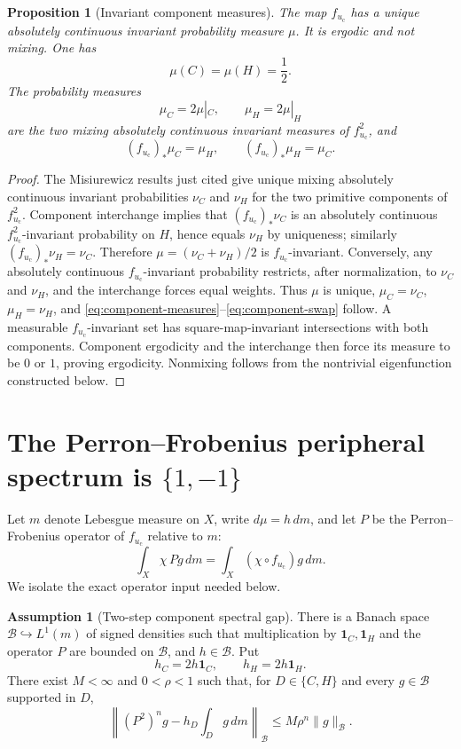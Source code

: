 \documentclass[11pt]{article}
\newtheorem{proposition}[theorem]{Proposition}
\theoremstyle{definition}
\newtheorem{assumption}[theorem]{Assumption}
\theoremstyle{remark}
\newcommand{\uc}{u_{\mathrm c}}
\newcommand{\cB}{\mathcal B}
\newcommand{\one}{\mathbf 1}
\begin{document}
\begin{proposition}[Invariant component measures]\label{prop:component-measures}
The map $f_{\uc}$ has a unique absolutely continuous invariant probability measure $\mu$.  It is ergodic and not mixing.  One has
\[
    \mu(C)=\mu(H)=\frac12.
\]
The probability measures
\begin{equation}\label{eq:component-measures}
    \mu_C=2\mu|_C,
    \qquad \mu_H=2\mu|_H
\end{equation}
are the two mixing absolutely continuous invariant measures of $f_{\uc}^2$, and
\[
    (f_{\uc})_*\mu_C=\mu_H,
    \qquad (f_{\uc})_*\mu_H=\mu_C.
\]
\end{proposition}

\begin{proof}
The Misiurewicz results just cited give unique mixing absolutely continuous invariant probabilities $\nu_C$ and $\nu_H$ for the two primitive components of $f_{\uc}^2$.  Component interchange implies that $(f_{\uc})_*\nu_C$ is an absolutely continuous $f_{\uc}^2$-invariant probability on $H$, hence equals $\nu_H$ by uniqueness; similarly $(f_{\uc})_*\nu_H=\nu_C$.  Therefore $\mu=(\nu_C+\nu_H)/2$ is $f_{\uc}$-invariant.  Conversely, any absolutely continuous $f_{\uc}$-invariant probability restricts, after normalization, to $\nu_C$ and $\nu_H$, and the interchange forces equal weights.  Thus $\mu$ is unique, $\mu_C=\nu_C$, $\mu_H=\nu_H$, and \eqref{eq:component-measures}--\eqref{eq:component-swap} follow.  A measurable $f_{\uc}$-invariant set has square-map-invariant intersections with both components.  Component ergodicity and the interchange then force its measure to be $0$ or $1$, proving ergodicity.  Nonmixing follows from the nontrivial eigenfunction constructed below.
\end{proof}

\section{The Perron--Frobenius peripheral spectrum is \texorpdfstring{$\{1,-1\}$}{\{1,-1\}}}

Let $m$ denote Lebesgue measure on $X$, write $d\mu=h\,dm$, and let $P$ be the Perron--Frobenius operator of $f_{\uc}$ relative to $m$:
\[
    \int_X \chi\,Pg\,dm
    =\int_X (\chi\circ f_{\uc})g\,dm.
\]
We isolate the exact operator input needed below.

\begin{assumption}[Two-step component spectral gap]\label{ass:component-gap}
There is a Banach space $\cB\hookrightarrow L^1(m)$ of signed densities such that multiplication by $\one_C,\one_H$ and the operator $P$ are bounded on $\cB$, and $h\in\cB$.  Put
\[
    h_C=2h\one_C,
    \qquad h_H=2h\one_H.
\]
There exist $M<\infty$ and $0<\rho<1$ such that, for $D\in\{C,H\}$ and every $g\in\cB$ supported in $D$,
\begin{equation}\label{eq:component-gap}
    \left\|(P^2)^n g-h_D\int_Dg\,dm\right\|_{\cB}
    \le M\rho^n\|g\|_{\cB}.
\end{equation}
\end{assumption}
\end{document}
